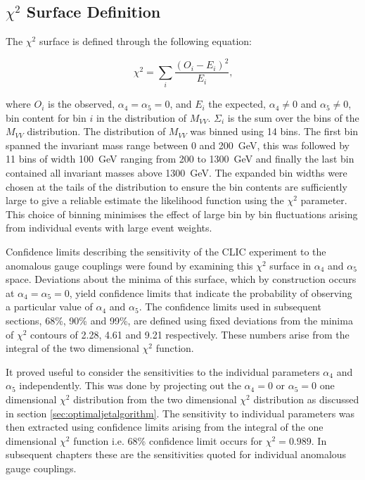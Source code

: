\subsection{$\chi^{2}$ Surface Definition}
\label{sec:chi2surfacedefinition}
The $\chi^{2}$ surface is defined through the following equation:

\begin{equation}
\chi^{2} = \sum_{i} \frac{(O_{i} - E_{i})^{2}}{E_{i}} \text{,}
\end{equation}

\noindent where $O_{i}$ is the observed, $\alpha_{4} = \alpha_{5} = 0$, and $E_{i}$ the expected, $\alpha_{4} \neq 0$ and $\alpha_{5} \neq 0$, bin content for bin $i$ in the distribution of $M_{VV}$.  $\Sigma_{i}$ is the sum over the bins of the $M_{VV}$ distribution.  The distribution of $M_{VV}$ was binned using 14 bins.  The first bin spanned the invariant mass range between 0 and 200~GeV, this was followed by 11 bins of width 100~GeV ranging from 200 to 1300~GeV and finally the last bin contained all invariant masses above 1300~GeV.  The expanded bin widths were chosen at the tails of the distribution to ensure the bin contents are sufficiently large to give a reliable estimate the likelihood function using the $\chi^{2}$ parameter.  This choice of binning minimises the effect of large bin by bin fluctuations arising from individual events with large event weights.

Confidence limits describing the sensitivity of the CLIC experiment to the anomalous gauge couplings were found by examining this $\chi^{2}$ surface in $\alpha_{4}$ and $\alpha_{5}$ space.  Deviations about the minima of this surface, which by construction occurs at $\alpha_{4} = \alpha_{5} = 0$, yield confidence limits that indicate the probability of observing a particular value of $\alpha_{4}$ and $\alpha_{5}$.  The confidence limits used in subsequent sections, 68\%, 90\% and 99\%, are defined using fixed deviations from the minima of $\chi^{2}$ contours of 2.28, 4.61 and 9.21 respectively.  These numbers arise from the integral of the two dimensional $\chi^{2}$ function.

It proved useful to consider the sensitivities to the individual parameters $\alpha_{4}$ and $\alpha_{5}$ independently.  This was done by projecting out the $\alpha_{4} = 0$ or $\alpha_{5} = 0$ one dimensional $\chi^{2}$ distribution from the two dimensional $\chi^{2}$ distribution as discussed in section \ref{sec:optimaljetalgorithm}.  The sensitivity to individual parameters was then extracted using confidence limits arising from the integral of the one dimensional $\chi^{2}$ function i.e. 68\% confidence limit occurs for $\chi^{2} = 0.989$.  In subsequent chapters these are the sensitivities quoted for individual anomalous gauge couplings. 

